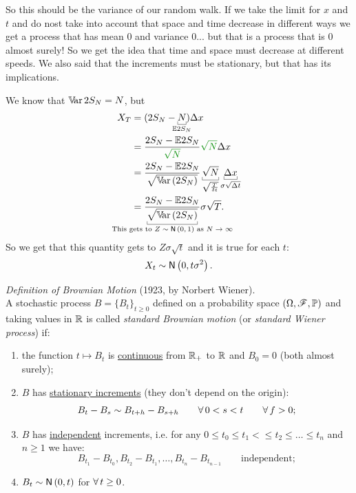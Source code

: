 \documentclass{report}
\begin{document}
So this should be the variance of our random walk. If we take the limit for $x$ and $t$ and do nost take into account that space and time decrease in different ways we get a process that has mean 0 and variance 0... but that is a process that is 0 almost surely! So we get the idea that time and space must decrease at different speeds. We also said that the increments must be stationary, but that has its implications.
\begin{remark}
	We know that $\mathbb{V}\!\mathrm{ar}\, 2S_{N}=N$, but
	\begin{align*}
		X_{T}&=(2S_{N}-\ubracketthin{N}_{\mathclap{\ev 2 S_{N}}})\Delta x\\
		&=\frac{2 S_{N}-\ev 2 S_{N}}{\mathcolor{Green4}{\sqrt{N}}}\mathcolor{Green4}{\sqrt{N}}\Delta x\\
		&=\frac{2S_{N}-\ev 2 S_{N}}{\sqrt{\var(2S_{N})}}\ubracketthin{\sqrt{N}}_{\sqrt{\frac{T}{\delta t}}}\ubracketthin{\Delta x}_{{\sigma\sqrt{\Delta t}}}\\
		&=\frac{2S_{N}-\ev 2 S_{N}}{\ubracketthin{\sqrt{\var(2S_{N})}}_{\claptext{This gets to $Z\distnorm{0,1}$ as $N\to\infty$}}}\sigma\sqrt{T}.
	\end{align*}
	So we get that this quantity gets to $Z\sigma\sqrt{t}$ and it is true for each $t$:
	\begin{equation*}
		X_{t}\sim\mathsf{N}\left(0,t\sigma^{2}\right).
	\end{equation*}
\end{remark}
\begin{definition}
	\emph{Definition of Brownian Motion} (1923, by Norbert Wiener).\\
	A stochastic process $B={\{B_{t}\}}_{t\geq 0}$ defined on a probability space $(\Omega,\mathscr{F},\mathbb{P})$ and taking values in $\mathbb{R}$ is called \emph{standard Brownian motion} (or \emph{standard Wiener process}) if:
	\begin{enumerate}
		\item the function $t\mapsto B_{t}$ is \ul{continuous} from $\mathbb{R}_{+}$ to $\mathbb{R}$ and $B_{0}=0$ (both almost surely);
		\item $B$ has \ul{stationary increments} (they don't depend on the origin):
		\begin{equation*}
			B_{t}-B_{s}\sim B_{t+h}-B_{s+h}\qquad\forall\, 0<s<t\qquad\forall\, f>0;
		\end{equation*}
		\item $B$ has \ul{independent} increments, i.e. for any $0\leq t_{0}\leq t_{1}<\leq t_{2}\leq\ldots\leq t_{n}$ and $n\geq 1$ we have:
		\begin{equation*}
			B_{t_1}-B_{t_0}, B_{t_2}-B_{t_1},\ldots,B_{t_{n}}-B_{t_{n-1}}\qquad\text{independent};
		\end{equation*}
		\item $B_{t}\sim\mathsf{N}\left(0,t\right)$ for $\forall\, t\geq 0$.
	\end{enumerate}
\end{definition}
\end{document}
